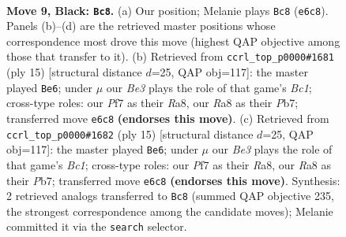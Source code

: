 \documentclass[11pt]{article}
\begin{document}
\clearpage

\begin{figure}[p]\centering
\begin{subfigure}{0.46\textwidth}\centering
\resizebox{\linewidth}{!}{%
\newchessgame
\chessboard[
  setfen={rn1qk2r/1p2bppp/p2pbn2/4p3/P3P3/2N2N2/1PP1BPPP/R1BQ1RK1 b kq - 0 9},
  showmover=false,
  pgfstyle=straightmove, color=movearrow, markmove={e6-c8}
]}
\caption{}
\end{subfigure}\hfill
\begin{subfigure}{0.46\textwidth}\centering
\resizebox{\linewidth}{!}{%
\newchessgame
\chessboard[
  setfen={r1bqkb1r/pp3pp1/2np1n1p/4p3/4P3/2N2N2/PPP1BPPP/R1BQ1RK1 b kq - 1 8},
  showmover=false,
  pgfstyle=straightmove, color=movearrow, markmove={c8-e6}
]}
\caption{}
\end{subfigure}
\\[4pt]
\begin{subfigure}{0.46\textwidth}\centering
\resizebox{\linewidth}{!}{%
\newchessgame
\chessboard[
  setfen={r1bqkb1r/pp3pp1/2np1n1p/4p3/4P3/2N2N2/PPP1BPPP/R1BQ1RK1 b kq - 1 8},
  showmover=false,
  pgfstyle=straightmove, color=movearrow, markmove={c8-e6}
]}
\caption{}
\end{subfigure}\hfill

\caption{\textbf{Move 9, Black: \texttt{Bc8}.} (a) Our position; Melanie plays \texttt{Bc8} (\texttt{e6c8}). Panels (b)--(d) are the retrieved master positions whose correspondence most drove this move (highest QAP objective among those that transfer to it). (b) Retrieved from \texttt{ccrl\_top\_p0000\#1681} (ply 15) [structural distance $d$=25, QAP obj=117]: the master played \texttt{Be6}; under $\mu$ our \emph{Be3} plays the role of that game's \emph{Bc1}; cross-type roles: our \emph{P}f7 as their \emph{R}a8, our \emph{R}a8 as their \emph{P}b7; transferred move \texttt{e6c8} \textbf{(endorses this move)}. (c) Retrieved from \texttt{ccrl\_top\_p0000\#1682} (ply 15) [structural distance $d$=25, QAP obj=117]: the master played \texttt{Be6}; under $\mu$ our \emph{Be3} plays the role of that game's \emph{Bc1}; cross-type roles: our \emph{P}f7 as their \emph{R}a8, our \emph{R}a8 as their \emph{P}b7; transferred move \texttt{e6c8} \textbf{(endorses this move)}. Synthesis: 2 retrieved analogs transferred to \texttt{Bc8} (summed QAP objective 235, the strongest correspondence among the candidate moves); Melanie committed it via the \texttt{search} selector.}
\label{fig:thought-m17}
\end{figure}
\end{document}
